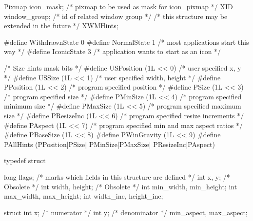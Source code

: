 \documentclass{report}
\begin{document}
\begin{itemize}
\begin{cppcode}
{                    Pixmap icon_mask;           /* pixmap to be used as mask for icon_pixmap */
                    XID window_group;           /* id of related window group */
                    /* this structure may be extended in the future */
                } XWMHints;
            \end{cppcode}
            \begin{cppcode}
                #define WithdrawnState 0
                #define NormalState 1           /* most applications start this way */
                #define IconicState 3           /* application wants to start as an icon */
            \end{cppcode}
            \begin{cppcode}
                /* Size hints mask bits */
                #define USPosition      (1L << 0)       /* user specified x, y */
                #define USSize          (1L << 1)       /* user specified width, height */
                #define PPosition       (1L << 2)       /* program specified position */
                #define PSize           (1L << 3)       /* program specified size */
                #define PMinSize        (1L << 4)       /* program specified minimum size */
                #define PMaxSize        (1L << 5)       /* program specified maximum size */
                #define PResizeInc      (1L << 6)       /* program specified resize increments */
                #define PAspect         (1L << 7)       /* program specified min and max aspect ratios */
                #define PBaseSize       (1L << 8)
                #define PWinGravity     (1L << 9)
                #define PAllHints   (PPosition|PSize| PMinSize|PMaxSize| PResizeInc|PAspect)
            \end{cppcode}
            \begin{cppcode}
                typedef struct {
                    long flags;                     /* marks which fields in this structure are defined */
                    int x, y;                       /* Obsolete */
                    int width, height;              /* Obsolete */
                    int min_width, min_height;
                    int max_width, max_height;
                    int width_inc, height_inc;

                    struct {
                        int x;                      /* numerator */
                        int y;                      /* denominator */
                    } min_aspect, max_aspect;

}
\end{cppcode}
\end{itemize}
\end{document}

